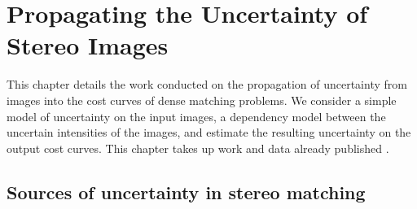 \chapter{Propagating the Uncertainty of Stereo Images}\label{chap:propagating}
This chapter details the work conducted on the propagation of uncertainty from images into the cost curves of dense matching problems. We consider a simple model of uncertainty on the input images, a dependency model between the uncertain intensities of the images, and estimate the resulting uncertainty on the output cost curves. This chapter takes up work and data already published \cite{malinowski_copulas_2022, malinowski_uncertainty_2023, malinowski_robust_2024}.

\section{Sources of uncertainty in stereo matching}\label{sec:sources_of_uncertainty}

